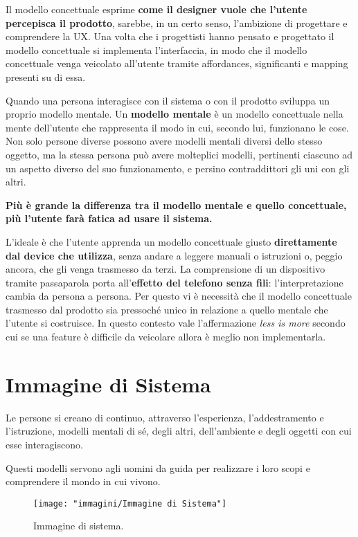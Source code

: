 Il modello concettuale esprime \textbf{come il designer vuole che l'utente percepisca il prodotto}, sarebbe, in un certo senso, l'ambizione di progettare e
comprendere la UX. Una volta che i progettisti hanno pensato e progettato il modello concettuale si implementa l'interfaccia, in modo che il modello
concettuale venga veicolato all'utente tramite affordances, significanti e mapping presenti su di essa.

Quando una persona interagisce con il sistema o con il prodotto sviluppa un proprio modello mentale. Un \textbf{modello mentale} è un modello concettuale
nella mente dell'utente che rappresenta il modo in cui, secondo lui, funzionano le cose. Non solo persone diverse possono avere modelli mentali diversi
dello stesso oggetto, ma la stessa persona può avere molteplici modelli, pertinenti ciascuno ad un aspetto diverso del suo funzionamento, e persino
contraddittori gli uni con gli altri.

\textbf{Più è grande la differenza tra il modello mentale e quello concettuale, più l'utente farà fatica ad usare il sistema.}

L'ideale è che l'utente apprenda un modello concettuale giusto \textbf{direttamente dal device che utilizza}, senza andare a leggere manuali o istruzioni
o, peggio ancora, che gli venga trasmesso da terzi. La comprensione di un dispositivo tramite passaparola porta all'\textbf{effetto del telefono senza
fili}: l'interpretazione cambia da persona a persona. Per questo vi è necessità che il modello concettuale trasmesso dal prodotto sia pressoché unico
in relazione a quello mentale che l'utente si costruisce. In questo contesto vale l'affermazione \textit{less is more} secondo cui se una feature è
difficile da veicolare allora è meglio non implementarla.

\section{Immagine di Sistema}
Le persone si creano di continuo, attraverso l'esperienza, l'addestramento e l'istruzione, modelli mentali di sé, degli altri, dell'ambiente e degli
oggetti con cui esse interagiscono.

Questi modelli servono agli uomini da guida per realizzare i loro scopi e comprendere il mondo in cui vivono.

\begin{figure}[!h]
	\centering
	\texttt{[image: "immagini/Immagine di Sistema"]}
	\caption{Immagine di sistema.}
\end{figure}

